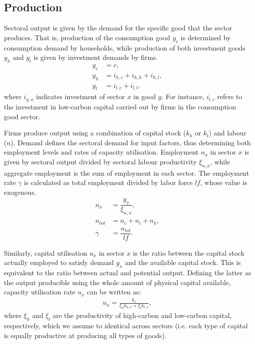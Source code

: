 \documentclass[authoryear]{article}
\begin{document}
\subsection{Production}
\label{sec:output}

Sectoral output is given by the demand for the specific good that the sector produces. That is, production of the consumption good $y_c$ is determined by consumption demand by households, while production of both investment goods $y_h$ and $y_l$ is given by investment demands by firms.
\begin{align}
y_c&=c,  \\
y_h&=i_{h,c}+i_{h,h}+i_{h,l}, \\
y_l&=i_{l,c}+i_{l,l},
\end{align}
where $i_{g,x}$ indicates investment of sector $x$ in good $g$. For instance, $i_{l,c}$ refers to the investment in low-carbon capital carried out by firms in the consumption good sector. 

Firms produce output using a combination of capital stock ($k_h$ or $k_l$) and labour ($n$). Demand defines the sectoral demand for input factors, thus determining both employment levels and rates of capacity utilisation. Employment $n_x$ in sector $x$ is given by sectoral output divided by sectoral labour productivity $\xi_{n,x}$, while aggregate employment is the sum of employment in each sector. The employment rate $\gamma$ is calculated as total employment divided by labor force $lf$, whose value is exogenous.
\begin{align}
n_x&=\dfrac{y_x}{\xi_{n,x}}, \\
n_{tot} &= n_c + n_i + n_k, \\
\gamma&=\dfrac{n_{tot}}{lf}.
\end{align}

Similarly, capital utilisation $u_x$ in sector $x$ is the ratio between the capital stock actually employed to satisfy demand $y_x$ and the available capital stock. This is equivalent to the ratio between actual and potential output. Defining the latter as the output producible using the whole amount of physical capital available, capacity utilisation rate $u_x$ can be written as:
\begin{gather}
u_x = \frac{y_x}{\xi_{h} k_{h,x} + \xi_{l} k_{l,x}},
\end{gather}
where $\xi_{h}$ and $\xi_{l}$ are the productivity of high-carbon and low-carbon capital, respectively, which we assume to identical across sectors (i.e. each type of capital is equally productive at producing all types of goods). 
\end{document}
